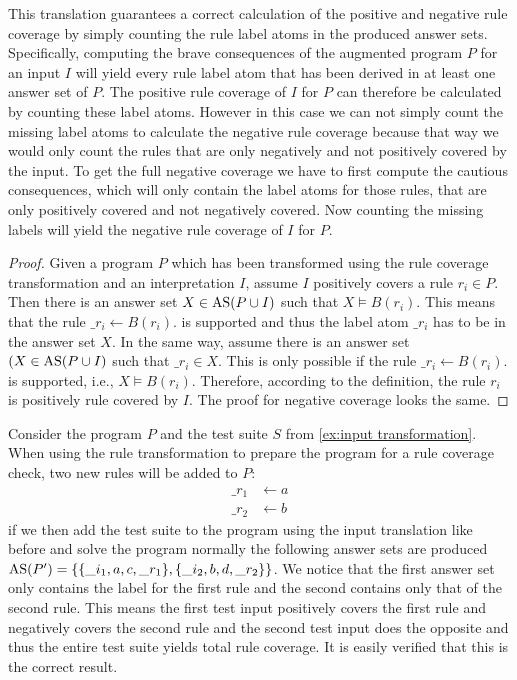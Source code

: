 This translation guarantees a correct calculation of the positive and negative rule coverage by simply counting the rule label atoms in the produced answer sets. Specifically, computing the brave consequences of the augmented program $P$ for an input $I$ will yield every rule label atom that has been derived in at least one answer set of $P$. The positive rule coverage of $I$ for $P$ can therefore be calculated by counting these label atoms. However in this case we can not simply count the missing label atoms to calculate the negative rule coverage because that way we would only count the rules that are only negatively and not positively covered by the input. To get the full negative coverage we have to first compute the cautious consequences, which will only contain the label atoms for those rules, that are only positively covered and not negatively covered. Now counting the missing labels will yield the negative rule coverage of $I$ for $P$.

\begin{proof}
    Given a program $P$ which has been transformed using the rule coverage transformation and an interpretation $I$, assume $I$ positively covers a rule \(r_i \in P\). Then there is an answer set \(X \in \operatorname{AS}(P \cup I)\) such that \(X \models B(r_i)\). This means that the rule \(\_r_i \leftarrow B(r_i).\) is supported and thus the label atom $\_r_i$ has to be in the answer set $X$. In the same way, assume there is an answer set \((X \in \operatorname{AS}(P \cup I)\) such that \(\_r_i \in X\). This is only possible if the rule \(\_r_i \leftarrow B(r_i).\) is supported, i.e., \(X \models B(r_i)\). Therefore, according to the definition, the rule $r_i$ is positively rule covered by $I$. The proof for negative coverage looks the same.
\end{proof}

\begin{example}
\label{ex:rule transformation}
    Consider the program $P$ and the test suite $S$ from \cref{ex:input transformation}. 
    When using the rule transformation to prepare the program for a rule coverage check, two new rules will be added to $P$:
    \begin{align*}
        \_r_1 &\leftarrow a \\
        \_r_2 &\leftarrow b 
    \end{align*}
    if we then add the test suite to the program using the input translation like before and solve the program normally the following answer sets are produced \(\operatorname{AS}(P') = \{\{\_i_1, a, c, \_r_1\}, \{\_i_2, b, d, \_r_2\}\}\). We notice that the first answer set only contains the label for the first rule and the second contains only that of the second rule. This means the first test input positively covers the first rule and negatively covers the second rule and the second test input does the opposite and thus the entire test suite yields total rule coverage. It is easily verified that this is the correct result.
\end{example}


